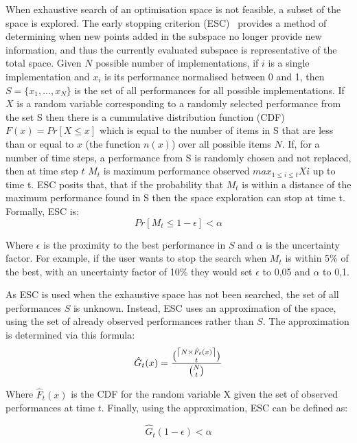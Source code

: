 When exhaustive search of an optimisation space is not feasible, a subset of the space is explored.
The early stopping criterion (ESC)~\cite{vuduc2003AutomaticPerf} provides a method of determining when new points added in the subspace no longer provide new information, and thus the currently evaluated subspace is representative of the total space.
Given $N$ possible number of implementations, if $i$ is a single implementation and $x_i$ is its performance normalised between 0 and 1, then $S=\{x_1,...,x_N\}$ is the set of all performances for all possible implementations.
If $X$ is a random variable corresponding to a randomly selected performance from the set S then there is a cummulative distribution function (CDF) $F(x) = Pr[X \le x]$ which is equal to the number of items in S that are less than or equal to $x$ (the function $n(x)$) over all possible items $N$.
If, for a number of time steps, a performance from S is randomly chosen and not replaced, then at time step $t$ $M_t$ is maximum performance observed $max_{1\le i \le t} Xi$ up to time t.
ESC posits that, that if the probability that $M_t$ is within a distance of the maximum performance found in S then the space exploration can stop at time t.
Formally, ESC is:
\begin{equation}
Pr[M_t \le 1 - \epsilon ] < \alpha
\end{equation}

Where $\epsilon$ is the proximity to the best performance in $S$ and $\alpha$ is the uncertainty factor.
For example, if the user wants to stop the search when $M_t$ is within 5\% of the best, with an uncertainty factor of 10\% they would set $\epsilon$ to 0,05 and $\alpha$ to 0,1.

As ESC is used when the exhaustive space has not been searched, the set of all performances $S$ is unknown.
Instead, ESC uses an approximation of the space, using the set of already observed performances rather than $S$.
The approximation is determined via this formula:
\begin{equation}
\hat{G}_t(x) = \frac{ \binom{\ceil*{N \times \hat{F}_t(x)}}{t}}{\binom{N}{t}}
\end{equation}

Where $\hat{F}_t(x)$ is the CDF for the random variable X given the set of observed performances at time $t$.
Finally, using the approximation, ESC can be defined as:

\begin{equation}
\hat{G}_t(1-\epsilon) < \alpha
\end{equation}
